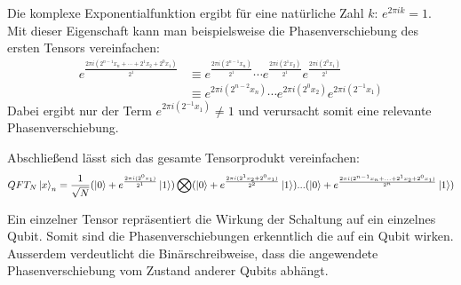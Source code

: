 Die komplexe Exponentialfunktion ergibt für eine natürliche Zahl \(k\): \(e^{2\pi i k} = 1\).
Mit dieser Eigenschaft kann man beispielsweise die Phasenverschiebung des ersten Tensors vereinfachen:
\begin{align*} 
  e^{\frac{2 \pi i (2^{n-1}x_n+ \dotsb +2^1x_2+2^0x_1)}{2^1}}
  &\equiv
  e^{\frac{2 \pi i (2^{n-1}x_n)}{2^1}} \dotsb e^{\frac{2 \pi i (2^1x_2)}{2^1}} e^{\frac{2 \pi i (2^0x_1)}{2^1}} \\
  &\equiv 
  e^{{2 \pi i (2^{n-2}x_n)}} \dotsb e^{{2 \pi i (2^0x_2)}} e^{{2 \pi i (2^{-1}x_1)}}
\end{align*}
Dabei ergibt nur der Term \(e^{{2 \pi i (2^{-1}x_1)}} \neq 1 \)  
und verursacht somit eine relevante Phasenverschiebung.

Abschließend lässt sich das gesamte Tensorprodukt vereinfachen:
\[QFT_{N}\ket{x}_{n} = \frac{1}{\sqrt{N}}(\ket{0} + { e^{\frac{2 \pi i (2^0x_1)}{2^1}}}\ket{1}) \operatorname{\bigotimes}
( \ket{0} + { e^{\frac{2 \pi i (2^1x_2+2^0x_1)}{2^2}}}\ket{1})...
( \ket{0} + { e^{\frac{2 \pi i (2^{n-1}x_n+ ... +2^1x_2+2^0x_1)}{2^n}}}\ket{1})\]

Ein einzelner Tensor repräsentiert die Wirkung der Schaltung auf ein einzelnes Qubit.
Somit sind die Phasenverschiebungen erkenntlich die auf ein Qubit wirken.
Ausserdem verdeutlicht die Binärschreibweise, dass die angewendete Phasenverschiebung vom Zustand anderer Qubits abhängt.

